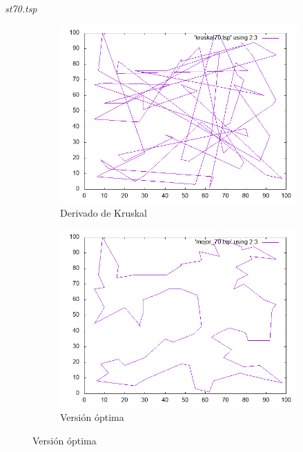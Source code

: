 \documentclass{beamer}
\begin{document}
\begin{frame}[fragile]{\textit{st70.tsp}}
\begin{figure}[H]
\begin{subfigure}[b]{0.36\textwidth}
\includegraphics[width=\textwidth]{st70_kruskal.png}
\caption*{\small{Derivado de Kruskal}}
\end{subfigure}
\quad
\begin{subfigure}[b]{0.36\textwidth}
\includegraphics[width=\textwidth]{st70_mejor.png}
\caption*{\small{Versión óptima}}
\end{subfigure}
\end{figure}

\end{frame}	
\end{document}

